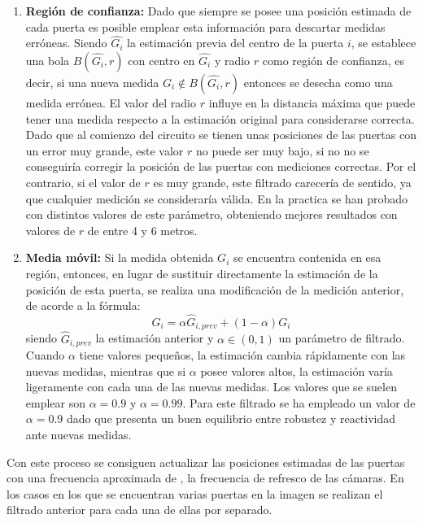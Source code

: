 \begin{enumerate}
	\item \textbf{Región de confianza:} Dado que siempre se posee una posición estimada de cada puerta es posible emplear esta información para descartar medidas erróneas. Siendo $\hat{G_i}$ la estimación previa del centro de la puerta $i$, se establece una bola $B(\hat{G_i},r)$ con centro en $\hat{G_i}$  y radio $r$ como región de confianza, es decir, si una nueva medida $G_i \notin B(\hat{G_i},r)$ entonces se desecha como una medida errónea.
	El valor del radio $r$ influye en la distancia máxima que puede tener una medida respecto a la estimación original para considerarse correcta. Dado que al comienzo del circuito se tienen unas posiciones de las puertas con un error muy grande, este valor $r$ no puede ser muy bajo, si no no se conseguiría corregir la posición de las puertas con mediciones correctas. Por el contrario, si el valor de $r$ es muy grande, este filtrado carecería de sentido, ya que cualquier medición se consideraría válida. En la practica se han probado con distintos valores de este parámetro, obteniendo mejores resultados con valores de $r$ de entre 4 y 6 metros.
	\item \textbf{Media móvil:} Si la medida obtenida $G_i$ se encuentra contenida en esa región, entonces, en lugar de sustituir directamente la estimación de la posición de esta puerta, se realiza una modificación de la medición anterior, de acorde a la fórmula:
	\begin{equation}
		\hat{G_i} = \alpha \hat{G}_{i,prev} + (1-\alpha)G_i
	\end{equation}
	siendo $\hat{G}_{i,prev}$ la estimación anterior y $\alpha \in (0,1)$ un parámetro de filtrado. Cuando $\alpha$ tiene valores pequeños, la estimación cambia rápidamente con las nuevas medidas, mientras que si $\alpha$ posee valores altos, la estimación varía ligeramente con cada una de las nuevas medidas. Los valores que se suelen emplear son $\alpha = 0.9$ y $\alpha = 0.99$. Para este filtrado se ha empleado un valor de $\alpha = 0.9$ dado que presenta un buen equilibrio entre robustez y reactividad ante nuevas medidas.

\end{enumerate}


Con este proceso se consiguen actualizar las posiciones estimadas de las puertas con una frecuencia aproximada de , la frecuencia de refresco de las cámaras. En los casos en los que se encuentran varias puertas en la imagen se realizan el filtrado anterior para cada una de ellas por separado.

